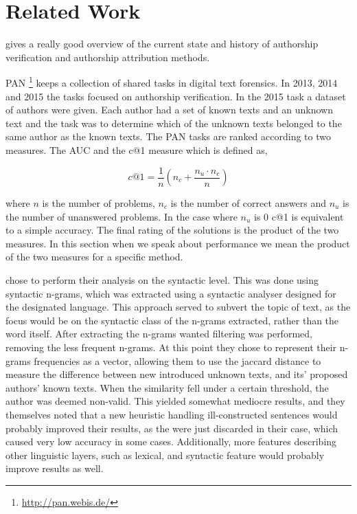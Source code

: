 \section{Related Work}
\cite{stamatos2009} gives a really good overview of the current state and
history of authorship verification and authorship attribution methods.

PAN \footnote{\url{http://pan.webis.de/}} keeps a collection of shared tasks in
digital text forensics. In 2013, 2014 and 2015 the tasks focused on authorship
verification. In the 2015 task a dataset of authors were given. Each author had
a set of known texts and an unknown text and the task was to determine which
of the unknown texts belonged to the same author as the known texts. The PAN
tasks are ranked according to two measures. The \gls{AUC} and the c@1 measure
\cite{penas2011} which is defined as,

\begin{equation}
    c@1 = \frac{1}{n} \left(n_c + \frac{n_u \cdot n_c}{n}\right)
\end{equation}

where $n$ is the number of problems, $n_c$ is the number of correct answers and
$n_u$ is the number of unanswered problems. In the case where $n_u$ is 0 c@1
is equivalent to a simple accuracy. The final rating of the solutions is the
product of the two measures. In this section when we speak about performance we
mean the product of the two measures for a specific method.

\cite{juanpablo2015} chose to perform their analysis on the syntactic level.
This was done using syntactic n-grams, which was extracted using a syntactic
analyser designed for the designated language. This approach served to subvert
the topic of text, as the focus would be on the syntactic class of the n-grams
extracted, rather than the word itself. After extracting the n-grams wanted
filtering was performed, removing the less frequent n-grams. At this point they
chose to represent their n-grams frequencies as a vector, allowing them to use
the jaccard distance to measure the difference between new introduced unknown
texts, and its' proposed authors' known texts. When the similarity fell under
a certain threshold, the author was deemed non-valid. This yielded somewhat
mediocre results, and they themselves noted that a new heuristic handling
ill-constructed sentences would probably improved their results, as the were
just discarded in their case, which caused very low accuracy in some cases.
Additionally, more features describing other linguistic layers, such as lexical,
and syntactic feature would probably improve results as well.

